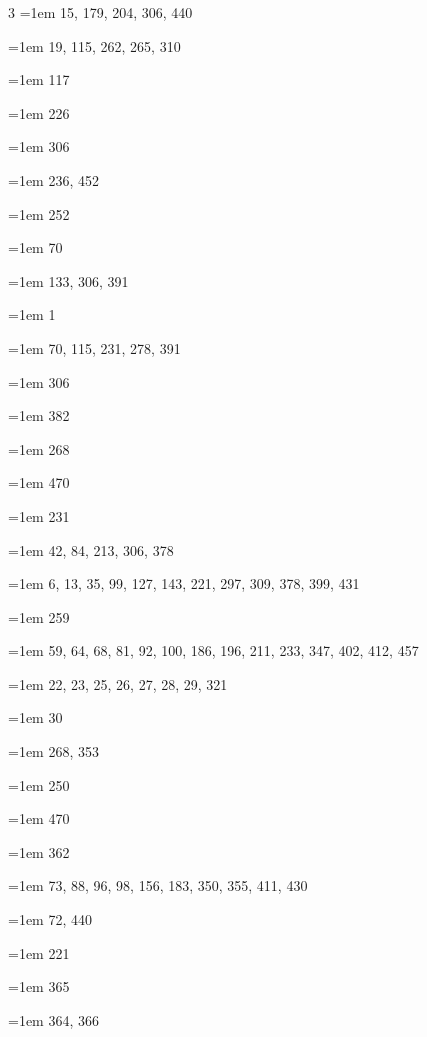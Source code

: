 \begin{multicols}{3}
\hangindent=1em  15, 179, 204, 306, 440\par
\hangindent=1em  19, 115, 262, 265, 310\par
\hangindent=1em  117\par
\hangindent=1em  226\par
\hangindent=1em  306\par
\hangindent=1em  236, 452\par
\hangindent=1em  252\par
\hangindent=1em  70\par
\hangindent=1em  133, 306, 391\par
\hangindent=1em  1\par
\hangindent=1em  70, 115, 231, 278, 391\par
\hangindent=1em  306\par
\hangindent=1em  382\par
\hangindent=1em  268\par
\hangindent=1em  470\par
\hangindent=1em  231\par
\hangindent=1em  42, 84, 213, 306, 378\par
\hangindent=1em  6, 13, 35, 99, 127, 143, 221, 297, 309, 378, 399, 431\par
\hangindent=1em  259\par
\hangindent=1em  59, 64, 68, 81, 92, 100, 186, 196, 211, 233, 347, 402, 412, 457\par
\hangindent=1em  22, 23, 25, 26, 27, 28, 29, 321\par
\hangindent=1em  30\par
\hangindent=1em  268, 353\par
\hangindent=1em  250\par
\hangindent=1em  470\par
\hangindent=1em  362\par
\hangindent=1em  73, 88, 96, 98, 156, 183, 350, 355, 411, 430\par
\hangindent=1em  72, 440\par
\hangindent=1em  221\par
\hangindent=1em  365\par
\hangindent=1em  364, 366\par

\end{multicols}
